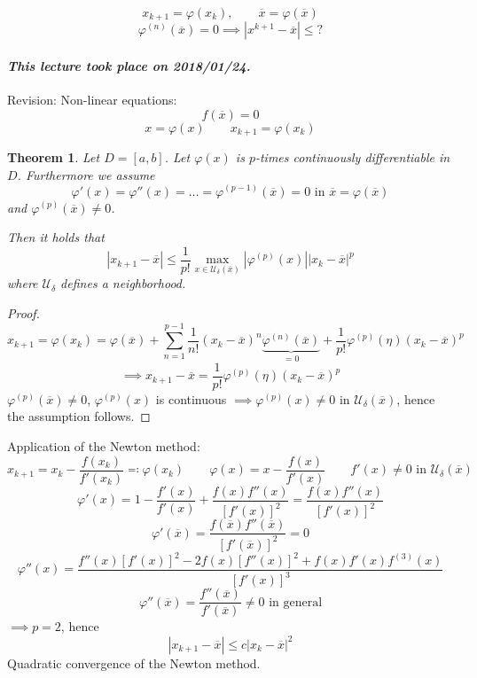 \documentclass{article}
\newtheorem{theorem}{Theorem}
\newcommand{\card}[1]{\left|#1\right|}
\newcommand{\abs}[1]{\left|#1\right|}
\newcommand{\dateref}[1]{\paragraph{\textit{This lecture took place on #1.}}}
\begin{document}
\[ x_{k+1} = \varphi(x_k), \qquad \overline x = \varphi(\overline x) \]
\[ \varphi^{(n)}(\overline x) = 0 \implies \card{x^{k+1} - \overline x} \leq ? \]

\dateref{2018/01/24}

Revision: Non-linear equations:
\[ f(\overline x) = 0 \]
\[ x = \varphi(x) \qquad x_{k+1} = \varphi(x_k) \]

\begin{theorem}
  Let $D = [a,b]$.
  Let $\varphi(x)$ is $p$-times continuously differentiable in $D$. Furthermore we assume
  \[ \varphi'(x) = \varphi''(x) = \ldots = \varphi^{(p-1)}(\overline x) = 0 \text{ in } \overline x = \varphi(\overline x) \]
  and $\varphi^{(p)}(\overline x) \neq 0$.

  Then it holds that
  \[ \abs{x_{k+1} - \overline x} \leq \frac1{p!} \max_{x \in \mathcal U_{\delta}(\overline x)} \card{\varphi^{(p)}(x)} \abs{x_k - \overline x}^p \]
  where $\mathcal U_{\delta}$ defines a neighborhood.
\end{theorem}
\begin{proof}
  \[ x_{k+1} = \varphi(x_k) = \varphi(\overline x) + \sum_{n=1}^{p-1} \frac{1}{n!} (x_k - \overline x)^n \underbrace{\varphi^{(n)}(\overline x)}_{=0} + \frac1{p!} \varphi^{(p)}(\eta)(x_k - \overline x)^p \]
  \[ \implies x_{k+1} - \overline x = \frac1{p!} \varphi^{(p)}(\eta)(x_k - \overline x)^p \]
  $\varphi^{(p)}(\overline x) \neq 0$, $\varphi^{(p)}(x)$ is continuous $\implies \varphi^{(p)}(x) \neq 0$ in $\mathcal U_{\delta}(\overline x)$, hence the assumption follows.
\end{proof}

Application of the Newton method:
\[ x_{k+1} = x_k - \frac{f(x_k)}{f'(x_k)} \eqqcolon \varphi(x_k) \qquad \varphi(x) = x - \frac{f(x)}{f'(x)} \qquad f'(x) \neq 0 \text{ in } \mathcal U_\delta(\overline x) \]
\[ \varphi'(x) = 1 - \frac{f'(x)}{f'(x)} + \frac{f(x) f''(x)}{[f'(x)]^2} = \frac{f(x) f''(x)}{[f'(x)]^2} \]
\[ \varphi'(\overline x) = \frac{f(\overline x) f''(\overline x)}{[f'(\overline x)]^2} = 0 \]
\[ \varphi''(x) = \frac{f''(x) [f'(x)]^2 - 2f(x) [f''(x)]^2 + f(x) f'(x) f^{(3)}(x)}{[f'(x)]^3} \]
\[ \varphi''(\overline x) = \frac{f''(\overline x)}{f'(\overline x)} \neq 0 \text{ in general} \]
$\implies p=2$, hence
\[ \abs{x_{k+1} - \overline x} \leq c \card{x_k - \overline x}^2 \]
Quadratic convergence of the Newton method.
\end{document}
